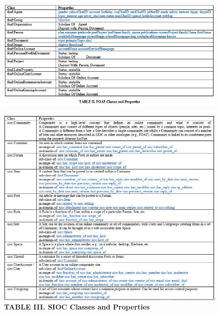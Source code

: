\documentclass[10pt,journal,compsoc]{IEEEtran}
\begin{document}
\begin{figure}[hbt]
\begin{center}
\includegraphics[width=6in]{DanielaTable2.JPG}       
\label{fig1}
\end{center}
\end{figure}

\begin{figure}[hbt]
\begin{center}
\includegraphics[width=6in]{DanielaTable3.JPG}     
\caption*{\textbf{TABLE III.  SIOC Classes and Properties}}  
\label{fig1}
\end{center}
\end{figure}
\end{document}
